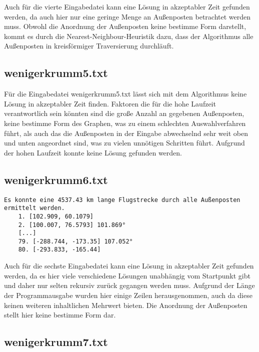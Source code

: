 \documentclass[a4paper,10pt,ngerman]{scrartcl}
\begin{document}
    Auch für die vierte Eingabedatei kann eine Lösung in akzeptabler Zeit gefunden werden,
    da auch hier nur eine geringe Menge an Außenposten betrachtet werden muss.
    Obwohl die Anordnung der Außenposten keine bestimme Form darstellt,
    kommt es durch die Nearest-Neighbour-Heuristik dazu, dass der Algorithmus alle Außenposten in kreisförmiger Traversierung durchläuft.


    \subsection{wenigerkrumm5.txt}\label{subsec:wenigerkrumm5.txt}

    Für die Eingabedatei wenigerkrumm5.txt lässt sich mit dem Algorithmus keine Lösung in akzeptabler Zeit finden.
    Faktoren die für die hohe Laufzeit verantwortlich sein könnten sind die große Anzahl an gegebenen Außenposten,
    keine bestimme Form des Graphen, was zu einem schlechten Auswahlverfahren führt,
    als auch das die Außenposten in der Eingabe abwechselnd sehr weit oben und unten angeordnet sind,
    was zu vielen unnötigen Schritten führt.
    Aufgrund der hohen Laufzeit konnte keine Lösung gefunden werden.

    \subsection{wenigerkrumm6.txt}\label{subsec:wenigerkrumm6.txt}


    \begin{lstlisting}[frame=single, title=Programmausgabe wenigerkrumm6.txt, breaklines=true,label={lst:lstlisting10}]
    Es konnte eine 4537.43 km lange Flugstrecke durch alle Außenposten ermittelt werden.
    1. [102.909, 60.1079]
    2. [100.007, 76.5793] 101.869°
    [...]
    79. [-288.744, -173.35] 107.052°
    80. [-293.833, -165.44]
    \end{lstlisting}

    Auch für die sechste Eingabedatei kann eine Lösung in akzeptabler Zeit gefunden werden,
    da es hier viele verschiedene Lösungen unabhängig vom Startpunkt gibt und daher nur selten rekursiv zurück gegangen werden muss.
    Aufgrund der Länge der Programmausgabe wurden hier einige Zeilen herausgenommen, auch da diese keinen weiteren inhaltlichen Mehrwert bieten.
    Die Anordnung der Außenposten stellt hier keine bestimme Form dar.

    \subsection{wenigerkrumm7.txt}\label{subsec:wenigerkrumm7.txt}
\end{document}
